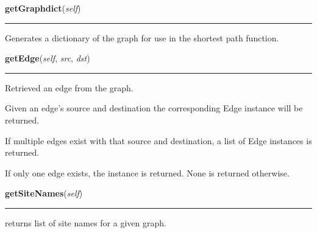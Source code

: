     \vspace{0.5ex}

    \begin{boxedminipage}{\textwidth}

    \raggedright \textbf{getGraphdict}(\textit{self})

    \vspace{-1.5ex}

    \rule{\textwidth}{0.5\fboxrule}
    Generates a dictionary of the graph for use in the shortest path 
    function.

    \vspace{1ex}

    \end{boxedminipage}

    \label{Epigrass:simobj:graph:getEdge}

    \vspace{0.5ex}

    \begin{boxedminipage}{\textwidth}

    \raggedright \textbf{getEdge}(\textit{self}, \textit{src}, \textit{dst})

    \vspace{-1.5ex}

    \rule{\textwidth}{0.5\fboxrule}
    Retrieved an edge from the graph.

    Given an edge's source and destination the corresponding Edge instance 
    will be returned.

    If multiple edges exist with that source and destination, a list of 
    Edge instances is returned.

    If only one edge exists, the instance is returned. None is returned 
    otherwise.

    \vspace{1ex}

    \end{boxedminipage}

    \label{Epigrass:simobj:graph:getSiteNames}

    \vspace{0.5ex}

    \begin{boxedminipage}{\textwidth}

    \raggedright \textbf{getSiteNames}(\textit{self})

    \vspace{-1.5ex}

    \rule{\textwidth}{0.5\fboxrule}
    returns list of site names for a given graph.

    \vspace{1ex}

    \end{boxedminipage}

